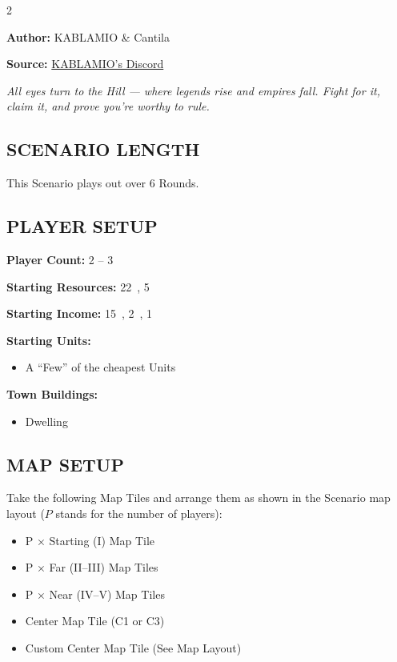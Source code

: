 
\begin{multicols}{2}

\textbf{Author:} KABLAMIO \& Cantila

\textbf{Source:} \href{https://discord.com/channels/1275490124301467799/1284428969369665631}{KABLAMIO's Discord}

\textit{All eyes turn to the Hill — where legends rise and empires fall. Fight for it, claim it, and prove you’re worthy to rule.}

\subsection*{\MakeUppercase{Scenario Length}}
This Scenario plays out over 6 Rounds.

\subsection*{\MakeUppercase{Player Setup}}
\textbf{Player Count:} 2 -- 3

\textbf{Starting Resources:} 22~, 5~

\textbf{Starting Income:} 15~, 2~, 1~

\textbf{Starting Units:}
\begin{itemize}
  \item A ``Few'' of the cheapest  Units
\end{itemize}

\textbf{Town Buildings:}
\begin{itemize}
  \item {} Dwelling
\end{itemize}

\subsection*{\MakeUppercase{Map Setup}}
Take the following Map Tiles and arrange them as shown in the Scenario map layout ($P$ stands for the number of players):

\begin{itemize}
  \item P × Starting (I) Map Tile
  \item P × Far (II--III) Map Tiles
  \item P × Near (IV--V) Map Tiles
  \item Center Map Tile (C1 or C3)
  \item Custom Center Map Tile (See Map Layout)
\end{itemize}


\end{multicols}
